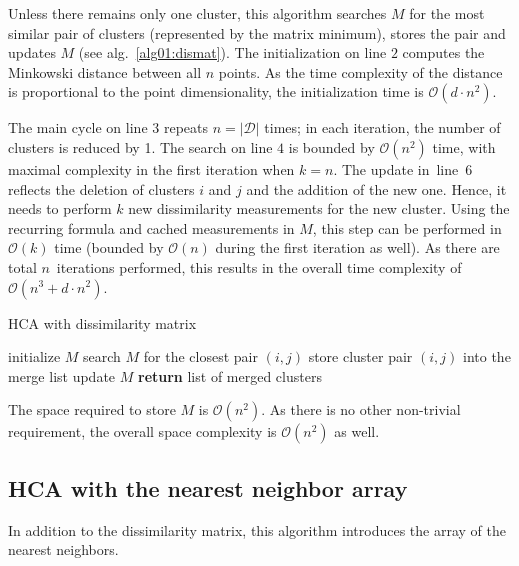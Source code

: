 Unless there remains only one cluster, this algorithm searches $M$ for the most similar pair of clusters (represented by the matrix minimum), stores the pair and updates $M$ (see alg.~\ref{alg01:dismat}). The initialization on line $2$ computes the Minkowski distance between all $n$ points. As the time complexity of the distance is proportional to the point dimensionality, the initialization time is $\mathcal{O}(d\cdot n^2)$.

The main cycle on line $3$ repeats $n = |\mathcal{D}|$ times; in each iteration, the number of clusters is reduced by 1. The search on line $4$ is bounded by $\mathcal{O}(n^2)$ time, with maximal complexity in the first iteration when $k=n$. The update in~line~$6$ reflects the deletion of clusters $i$ and $j$ and the addition of the new one. Hence, it needs to perform $k$ new dissimilarity measurements for the new cluster. Using the recurring formula and cached measurements in $M$, this step can be performed in $\mathcal{O}(k)$ time (bounded by $\mathcal{O}(n)$ during the first iteration as well). As there are total $n$~iterations performed, this results in the overall time complexity of $\mathcal{O}(n^3+d\cdot n^2)$. 

\begin{algorithm}[t]
	\caption{HCA with dissimilarity matrix}
	\label{alg01:dismat}
	\begin{algorithmic}[1]
		\State initialize $M$ 
		\State search $M$ for the closest pair $(i,j)$ 
		\State store cluster pair $(i,j)$ into the merge list 
		\State update $M$ 
		\EndFor
		\State \textbf{return} list of merged clusters
		\EndProcedure
	\end{algorithmic}
\end{algorithm}

The space required to store $M$ is $\mathcal{O}(n^2)$. As there is no other non-trivial requirement, the overall space complexity is $\mathcal{O}(n^2)$ as well.

\subsection{HCA with the nearest neighbor array}

In addition to the dissimilarity matrix, this algorithm introduces the array of the nearest neighbors.

